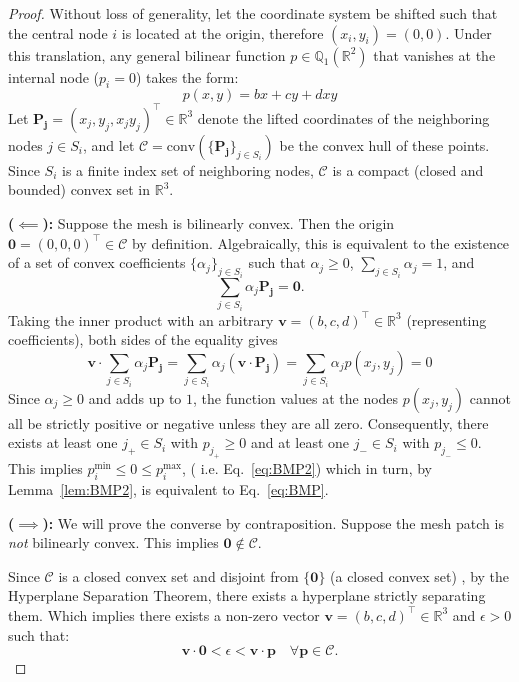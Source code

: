 \documentclass[a4paper]{article}
\theoremstyle{plain}
\theoremstyle{definition}
\theoremstyle{remark}
\begin{document}
\begin{proof}
Without loss of generality, let the coordinate system be shifted such that the central node $i$ is located at the origin, therefore $(x_i, y_i) = (0,0)$. Under this translation, any general bilinear function $p \in \mathbb{Q}_1(\mathbb{R}^2)$ that vanishes at the internal node ($p_i = 0$) takes the form:
$$
p(x,y) = bx + cy + dxy
$$
Let $ \mathbf{P_j} = (x_j, y_j, x_j y_j)^\top \in \mathbb{R}^3$ denote the lifted coordinates of the neighboring nodes $j \in S_i$, and let $\mathcal{C} = \text{conv}(\{\mathbf{P_j}\}_{j \in S_i})$ be the convex hull of these points. Since $S_i$ is a finite index set of neighboring nodes, $\mathcal{C}$ is a compact (closed and bounded) convex set in $\mathbb{R}^3$.

\textbf{($\impliedby$):} 
Suppose the mesh is bilinearly convex. Then the origin $\mathbf{0} = (0,0,0)^\top \in \mathcal{C}$ by definition. Algebraically, this is equivalent to the existence of a set of convex coefficients $\{\alpha_j\}_{j \in S_i}$ such that $\alpha_j \geq 0$, $\sum_{j \in S_i} \alpha_j = 1$, and
$$
\sum_{j \in S_i} \alpha_j \mathbf{P_j} = \mathbf{0}.
$$
Taking the inner product with an arbitrary $\mathbf{v} = (b,c,d)^\top \in \mathbb{R}^3$ (representing coefficients), both sides of the equality gives
$$
\mathbf{v} \cdot \sum_{j \in S_i} \alpha_j \mathbf{P_j} = \sum_{j \in S_i} \alpha_j (\mathbf{v} \cdot \mathbf{P_j}) = \sum_{j \in S_i} \alpha_j p(x_j, y_j) = 0
$$
	Since $\alpha_j \geq 0$ and adds up to $1$, the function values at the nodes $p(x_j, y_j)$ cannot all be strictly positive or negative unless they are all zero. Consequently, there exists at least one $j_+ \in S_i$ with  $p_{j_+}\geq 0$ and at least one $j_- \in S_i$ with  $p_{j_-}\leq 0$. This implies $p_i^{\min} \leq 0 \leq p_i^{\max}$, ( i.e. Eq.~\eqref{eq:BMP2}) which in turn, by Lemma~\ref{lem:BMP2},  is equivalent to Eq.~\eqref{eq:BMP}.
	
\textbf{ ($\implies$):} 
We will prove the converse by contraposition. Suppose the mesh patch is \textit{not} bilinearly convex. This implies  $\mathbf{0} \notin \mathcal{C}$.
	
Since $\mathcal{C}$ is a closed convex set and disjoint from  $\{\mathbf{0}\}$ (a closed convex set) , by the Hyperplane Separation Theorem, there exists a hyperplane strictly separating them. Which implies there exists a non-zero vector $\mathbf{v} = (b, c, d)^\top \in \mathbb{R}^3$ and $\epsilon > 0$ such that:
$$
\mathbf{v} \cdot \mathbf{0} < \epsilon < \mathbf{v} \cdot \mathbf{p} \quad \forall \mathbf{p} \in \mathcal{C}.
$$


\end{proof}
\end{document}
